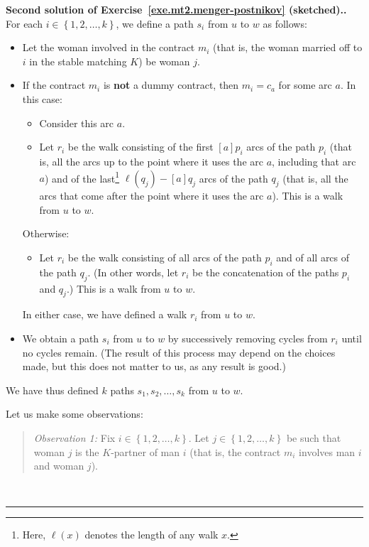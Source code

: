 \documentclass[numbers=enddot,12pt,final,onecolumn,notitlepage]{scrartcl}%
\theoremstyle{definition}
\newenvironment{statement}{\begin{quote}}{\end{quote}}
\newenvironment{proof}[1][Proof]{\noindent\textbf{#1.} }{\ \rule{0.5em}{0.5em}}
\newcommand{\set}[1]{\left\{ #1 \right\}}
\newcommand{\tup}[1]{\left( #1 \right)}
\newcommand{\ive}[1]{\left[ #1 \right]}
\begin{document}
\begin{proof}[Second solution of
Exercise~\ref{exe.mt2.menger-postnikov} (sketched).]
For each $i \in \set{1, 2, \ldots, k}$, we define a path $s_i$
from $u$ to $w$ as follows:
\begin{itemize}
\item Let the woman involved in the contract $m_i$ (that is, the
      woman married off to $i$ in the stable matching $K$) be
      woman $j$.
\item If the contract $m_i$ is \textbf{not} a dummy contract,
      then $m_i = c_a$ for some arc $a$.
      In this case:
      \begin{itemize}
      \item Consider this arc $a$.
      \item Let $r_i$ be the walk consisting of the first
            $\ive{a} p_i$ arcs of the path $p_i$
            (that is, all the arcs up to the point where it uses
            the arc $a$, including that arc $a$) and of the
            last\footnote{Here, $\ell\tup{x}$ denotes the length
            of any walk $x$.}
            $\ell\tup{q_j} - \ive{a} q_j$ arcs of the path
            $q_j$ (that is, all the arcs that come after the point
            where it uses the arc $a$).
            This is a walk from $u$ to $w$.
      \end{itemize}
      Otherwise:
      \begin{itemize}
      \item Let $r_i$ be the walk consisting of all
            arcs of the path $p_i$
            and of all arcs of the path $q_j$.
            (In other words, let $r_i$ be the concatenation of
            the paths $p_i$ and $q_j$.)
            This is a walk from $u$ to $w$.
      \end{itemize}
      In either case, we have defined a walk $r_i$ from $u$ to $w$.
\item We obtain a path $s_i$ from $u$ to $w$ by successively
      removing cycles from $r_i$ until no cycles remain.
      (The result of this process may depend on the choices made,
      but this does not matter to us, as any result is good.)
\end{itemize}

We have thus defined $k$ paths $s_1, s_2, \ldots, s_k$ from
$u$ to $w$.

Let us make some observations:

\begin{statement}
\textit{Observation 1:}
Fix $i \in \set{1, 2, \ldots, k}$.
Let $j \in \set{1, 2, \ldots, k}$ be such that woman $j$ is
the $K$-partner of man $i$
(that is, the contract $m_i$ involves man $i$ and woman $j$).


\end{statement}
\end{proof}
\end{document}
